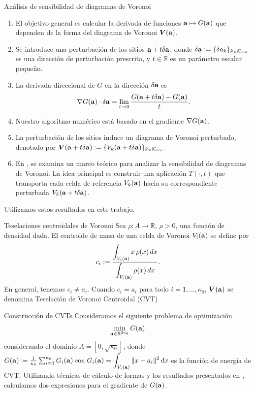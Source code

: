 \documentclass[final]{beamer}
\newcommand{\R}{\mathbb{R}}
\newcommand{\bsi}{{\bf a}}
\newcommand{\si}{a}
\newcommand{\mL}{\mathcal{K}_{\textrm{vor}}}
\newcommand{\mV}{\bm{V}}
\newlength{\colwidth}
\begin{document}
\begin{frame}[t]
\begin{columns}[t]
\begin{column}{\colwidth}
\begin{exampleblock}{Análisis de sensibilidad de diagramas de Voronoi}
    \begin{enumerate}
        \item El objetivo general es calcular la derivada de funciones $\bsi\mapsto G(\bsi)$ que dependen de la forma del diagrama de Voronoi $\mV(\bsi)$.
        \item Se introduce una perturbación de los sitios $\bsi+t\delta\bsi$, donde $\delta\bsi := \{\delta a_k\}_{k\in\mL}$ es una dirección de perturbación prescrita, y $t\in \R$ es un parámetro escalar pequeño.
        \item La derivada direccional de $G$ en la dirección $\delta \bsi$ es
        $$ \small\nabla G(\bsi) \cdot \delta\bsi = \lim_{t\to 0} \frac{G(\bsi+t\delta\bsi) - G(\bsi)}{t}.$$
        \item Nuestro algoritmo numérico está basado en el gradiente $\nabla G(\bsi)$.
        \item La perturbación de los sitios induce un diagrama de Voronoi perturbado, denotado por 
        $\mV(\bsi+t\delta\bsi) := \{V_k(\bsi+t\delta\bsi)\}_{k\in\mL}.$
        \item En \cite[\S4]{birgin:01}, se examina un marco teórico para analizar la sensibilidad de diagramas de Voronoi. La idea principal es construir una aplicación $T(\cdot, t)$ que transporta cada celda de referencia $V_k(\bsi)$ hacia su correspondiente perturbada $V_k(\bsi+t\delta\bsi)$.
    \end{enumerate}
    Utilizamos estos resultados en este trabajo.
\end{exampleblock}

\begin{block}{Teselaciones centroidales de Voronoi}
Sea $\rho: A\to \R$, $\rho >0$, una función de densidad dada.
El centroide de masa de una celda de Voronoi $V_i(\bsi)$ se define por
$$
\small c_i := \frac{\displaystyle \int_{V_i(\bsi)} x \,\rho(x)\,dx}{\displaystyle \int_{V_i(\bsi)} \rho(x)\,dx}.
$$
En general, tenemos $c_i \neq \si_i$. Cuando $c_i= \si_i$ para todo $i=1,\dots,\kappa_0$, $\mV(\bsi)$ se denomina Teselación de Voronoi Centroidal (CVT)
\end{block}
\begin{block}{Construcción de CVTs}
Consideramos el siguiente problema de optimización
\begin{equation*}
\small\min_{\bsi\in \R^{2\kappa_0}} G(\bsi)
\end{equation*}
considerando el dominio $A=[0,\sqrt{\kappa_0}]$, donde $\small G(\bsi)\coloneq \frac{1}{\kappa_0}\sum^{\kappa_0}_{i=1} G_i(\bsi) \text{ con } G_i(\bsi) = \displaystyle\int_{V_i(\bsi)}\|x-a_i\|^2\,dx$ es la función de energía de CVT. Utilizando técnicas de cálculo de formas y los resultados presentados en \cite{birgin:01}, calculamos dos expresiones para el gradiente de $G(\bsi)$.
\end{block}


\end{column}
\end{columns}
\end{frame}
\end{document}
